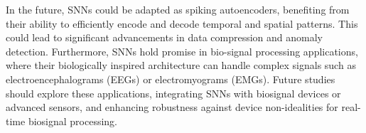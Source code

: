 In the future, SNNs could be adapted as spiking autoencoders, benefiting from their ability to efficiently encode and decode temporal and spatial patterns. This could lead to significant advancements in data compression and anomaly detection. Furthermore, SNNs hold promise in bio-signal processing applications, where their biologically inspired architecture can handle complex signals such as electroencephalograms (EEGs) or electromyograms (EMGs). Future studies should explore these applications, integrating SNNs with biosignal devices or advanced sensors, and enhancing robustness against device non-idealities for real-time biosignal processing.\\
